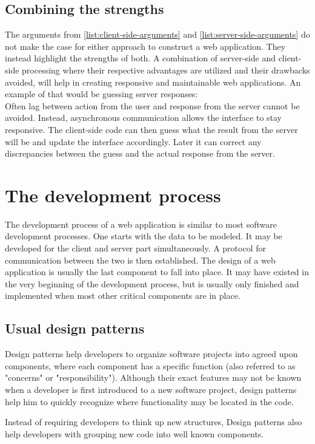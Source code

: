 \documentclass[thesis.tex]{subfiles}
\begin{document}
\subsection{Combining the strengths}
The arguments from
\ref{list:client-side-arguments} and \ref{list:server-side-arguments}
do not make the case
for either approach to construct a web application.
They instead highlight the strengths of both.
A combination of server-side and client-side processing where their respective
advantages are utilized and their drawbacks avoided, will help in creating
responsive and maintainable web applications.
An example of that would be guessing server responses:\\
Often lag between action from the user and response from the server cannot be
avoided. Instead, asynchronous communication allows the interface to stay
responsive. The client-side code can then guess what the result from the server
will be and update the interface accordingly.
Later it can correct any discrepancies between the guess and the actual
response from the server.

\section{The development process}
The development process of a web application is similar to most
software development processes. One starts with the data to be modeled.
It may be developed for the client and server part simultaneously.
A protocol for communication between the two is then established.
The design of a web application is usually the last component to fall
into place. It may have existed in the very beginning of the development
process, but is usually only finished and implemented when most other critical
components are in place.

\subsection{Usual design patterns}
Design patterns help developers to organize software projects into agreed upon
components, where each component has a specific function
(also referred to as "concerns" or "responsibility").
Although their exact features may not be known when a developer is first
introduced to a new software project, design patterns help him to quickly
recognize where functionality may be located in the code.

Instead of requiring developers to think up new structures, Design patterns
also help developers with grouping new code into well known components.
\end{document}
